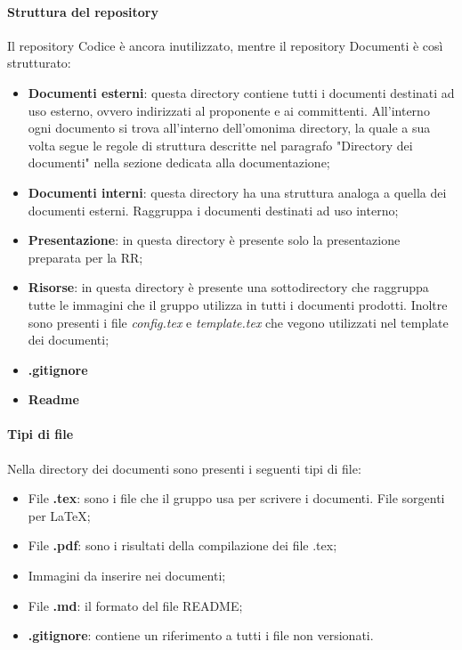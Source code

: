 \documentclass[../norme_di_progetto.tex]{subfiles}
\begin{document}
\paragraph{Struttura del repository}
Il repository Codice è ancora inutilizzato, mentre il repository Documenti è così strutturato:
\begin{itemize}
    \item \textbf{Documenti esterni}: questa directory contiene tutti i documenti destinati ad uso esterno, ovvero indirizzati al proponente e ai committenti. All'interno ogni documento si trova all'interno dell'omonima directory, la quale a sua volta segue le regole di struttura descritte nel paragrafo "Directory dei documenti" nella sezione dedicata alla documentazione;
    \item \textbf{Documenti interni}: questa directory ha una struttura analoga a quella dei documenti esterni. Raggruppa i documenti destinati ad uso interno;
    \item \textbf{Presentazione}: in questa directory è presente solo la presentazione preparata per la RR;
    \item \textbf{Risorse}: in questa directory è presente una sottodirectory che raggruppa tutte le immagini che il gruppo utilizza in tutti i documenti prodotti. Inoltre sono presenti i file \emph{config.tex} e \emph{template.tex} che vegono utilizzati nel template dei documenti;
    \item \textbf{.gitignore}
    \item \textbf{Readme}
\end{itemize}

\paragraph{Tipi di file}
Nella directory dei documenti sono presenti i seguenti tipi di file:
\begin{itemize}
    \item File \textbf{.tex}: sono i file che il gruppo usa per scrivere i documenti. File sorgenti per \LaTeX;
    \item File \textbf{.pdf}: sono i risultati della compilazione dei file .tex;
    \item Immagini da inserire nei documenti;
    \item File \textbf{.md}: il formato del file README;
    \item \textbf{.gitignore}: contiene un riferimento a tutti i file non versionati.
\end{itemize}
\end{document}
